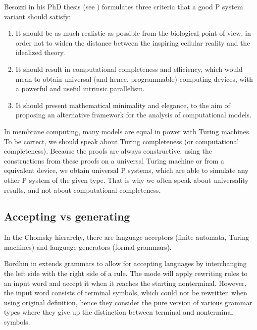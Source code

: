 Besozzi in his PhD thesis (see \cite{Besozzi:PhD:2004}) formulates three criteria that a good P system variant should satisfy:

\begin{enumerate}
	\item It should be as much realistic as possible from the biological point of view, in order not to widen the distance between the inspiring cellular reality and the idealized theory.
	\item It should result in computational completeness and efficiency, which would mean to obtain universal (and hence, programmable) computing devices, with a powerful and useful intrinsic parallelism.
	\item It should present mathematical minimality and elegance, to the aim of proposing an alternative framework for the analysis of computational models.
\end{enumerate}

In membrane computing, many models are equal in power with Turing machines. To be correct, we should speak about Turing completeness (or computational completeness). Because the proofs are always constructive, using the constructions from these proofs on a universal Turing machine or from a equivalent device, we obtain universal P systems, which are able to simulate any other P system of the given type. That is why we often speak about universality results, and not about computational completeness.

\subsection{Accepting vs generating} %
\label{sub:accepting_vs_generating}

In the Chomsky hierarchy, there are  language acceptors (finite automata, Turing machines) and  language generators (formal grammars).


Bordhin in \cite{Bordihn99acceptingpure} extends grammars to allow for accepting languages by interchanging the left side with the right side of a rule. The mode will apply rewriting rules to an input word and accept it when it reaches the starting nonterminal. However, the input word consists of terminal symbols, which could not be rewritten when using original definition, hence they consider the  pure version of various grammar types where they give up the distinction between terminal and nonterminal symbols.

